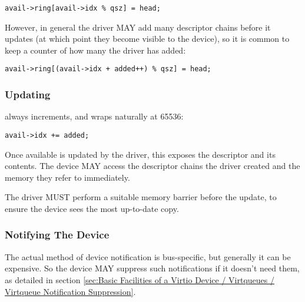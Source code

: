 \begin{lstlisting}
avail->ring[avail->idx % qsz] = head;
\end{lstlisting}

However, in general the driver MAY add many descriptor chains before it updates
 (at which point they become visible to the
device), so it is common to keep a counter of how many the driver has added:

\begin{lstlisting}
avail->ring[(avail->idx + added++) % qsz] = head;
\end{lstlisting}

\subsubsection{Updating }\label{sec:Basic Facilities of a Virtio Device / Virtqueues / Supplying Buffers to The Device / Updating idx}

 always increments, and wraps naturally at
65536:

\begin{lstlisting}
avail->idx += added;
\end{lstlisting}

Once available  is updated by the driver, this exposes the
descriptor and its contents.  The device MAY
access the descriptor chains the driver created and the
memory they refer to immediately.

The driver MUST perform a suitable memory barrier before the  update, to ensure the
device sees the most up-to-date copy.

\subsubsection{Notifying The Device}\label{sec:Basic Facilities of a Virtio Device / Virtqueues / Supplying Buffers to The Device / Notifying The Device}

The actual method of device notification is bus-specific, but generally
it can be expensive.  So the device MAY suppress such notifications if it
doesn't need them, as detailed in section \ref{sec:Basic Facilities of a Virtio Device / Virtqueues / Virtqueue Notification Suppression}.

